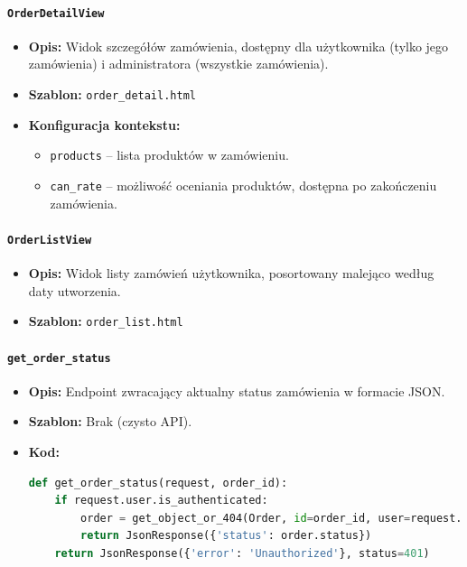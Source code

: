 \documentclass[12pt,a4paper,oneside]{article}
\theoremstyle{definition}
\numberwithin{equation}{section}
\begin{document}
\paragraph{\texttt{OrderDetailView}}
\begin{itemize}
    \item \textbf{Opis:} Widok szczegółów zamówienia, dostępny dla użytkownika (tylko jego zamówienia) i administratora (wszystkie zamówienia).
    \item \textbf{Szablon:} \texttt{order\_detail.html}
    \item \textbf{Konfiguracja kontekstu:}
    \begin{itemize}
        \item \texttt{products} – lista produktów w zamówieniu.
        \item \texttt{can\_rate} – możliwość oceniania produktów, dostępna po zakończeniu zamówienia.
    \end{itemize}
\end{itemize}

\paragraph{\texttt{OrderListView}}
\begin{itemize}
    \item \textbf{Opis:} Widok listy zamówień użytkownika, posortowany malejąco według daty utworzenia.
    \item \textbf{Szablon:} \texttt{order\_list.html}
\end{itemize}

\paragraph{\texttt{get\_order\_status}}
\begin{itemize}
    \item \textbf{Opis:} Endpoint zwracający aktualny status zamówienia w formacie JSON.
    \item \textbf{Szablon:} Brak (czysto API).
    \item \textbf{Kod:}
    \begin{lstlisting}[language=Python]
def get_order_status(request, order_id):
    if request.user.is_authenticated:
        order = get_object_or_404(Order, id=order_id, user=request.user)
        return JsonResponse({'status': order.status})
    return JsonResponse({'error': 'Unauthorized'}, status=401)
    \end{lstlisting}
\end{itemize}
\end{document}
